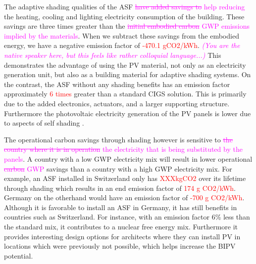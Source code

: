 
The adaptive shading qualities of the ASF \textcolor{magenta}{\sout{have added savings to} help reducing} the heating, cooling and lighting electricity consumption of the building. These savings are three times greater than the \textcolor{magenta}{\sout{initial embodied carbon} GWP emissions implied by the materials}. When we subtract these savings from the embodied energy, we have a negative emission factor of \textcolor{red}{-470.1 gCO2/kWh}. \textcolor{magenta}{\textit{(You are the native speaker here, but this feels like rather colloquial language...)}} This demonstrates the advantage of using the PV material, not only as an electricity generation unit, but also as a building material for adaptive shading systems. On the contrast, the ASF without any shading benefits has an emission factor approximately \textcolor{red}{6 times} greater than a standard CIGS solution. This is primarily due to the added electronics, actuators, and a larger supporting structure. Furthermore the photovoltaic electricity generation of the PV panels is lower due to aspects of self shading \cite{hofer2015photovoltaics}. 

The operational carbon savings through shading however is sensitive to \textcolor{magenta}{\sout{the country where it is in operation} the electricity that is being substituted by the panels}. A country with a low GWP electricity mix will result in lower operational \textcolor{magenta}{\sout{carbon} GWP} savings than a country with a high GWP electricity mix. For example, an ASF installed in Switzerland only has \textcolor{red}{XXXkgCO2} over its lifetime through shading which results in an end emission factor of \textcolor{red}{174 g CO2/kWh}. Germany on the otherhand would have an emission factor of \textcolor{red}{-700 g CO2/kWh}.\\

Although it is favorable to install an ASF in Germany, it has still benefits in countries such as Switzerland. For instance, with an emission factor 6\% less than the standard mix, it contributes to a nuclear free energy mix. Furthermore it provides interesting design options for architects where they can install PV in locations which were previously not possible, which helps increase the BIPV potential.  \\

